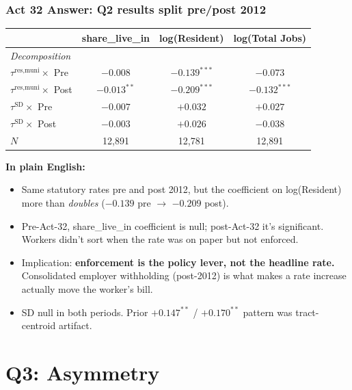 \documentclass[xcolor = x11names, compress, aspectratio = 169]{beamer}
\renewcommand{\(}{\begin{columns}}
\renewcommand{\)}{\end{columns}}
\newcommand{\<}[1]{\begin{column}{#1}}
\renewcommand{\>}{\end{column}}
\begin{document}
\begin{frame}
\frametitle{Act 32 Answer: Q2 results split pre/post 2012}
    \centering
    \small
    \begin{tabular}{lccc}
        \toprule
        & share\_live\_in & log(Resident) & log(Total Jobs) \\
        \midrule
        \multicolumn{4}{l}{\textit{Decomposition}} \\
        $\tau^{\text{res,muni}} \times $ Pre  & $-0.008$       & $-0.139^{***}$ & $-0.073$ \\
        $\tau^{\text{res,muni}} \times $ Post & $-0.013^{**}$  & $-0.209^{***}$ & $-0.132^{***}$ \\
        $\tau^{\text{SD}} \times $ Pre        & $-0.007$       & $+0.032$       & $+0.027$ \\
        $\tau^{\text{SD}} \times $ Post       & $-0.003$       & $+0.026$       & $-0.038$ \\
        \midrule
        $N$                                    & 12{,}891 & 12{,}781 & 12{,}891 \\
        \bottomrule
    \end{tabular}
    \vspace{0.10cm}
    \textbf{In plain English:}
    \begin{itemize}\setlength{\itemsep}{0.02cm}\scriptsize
        \item Same statutory rates pre and post 2012, but the coefficient on log(Resident) more than \emph{doubles} ($-0.139$ pre $\to$ $-0.209$ post).
        \item Pre-Act-32, share\_live\_in coefficient is null; post-Act-32 it's significant. Workers didn't sort when the rate was on paper but not enforced.
        \item Implication: \textbf{enforcement is the policy lever, not the headline rate.} Consolidated employer withholding (post-2012) is what makes a rate increase actually move the worker's bill.
        \item SD null in both periods. Prior $+0.147^{**}$ / $+0.170^{**}$ pattern was tract-centroid artifact.
    \end{itemize}
\end{frame}

\section{Q3: Asymmetry}
\end{document}
